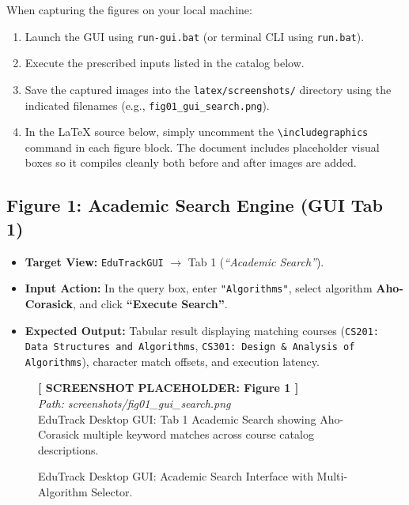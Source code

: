 \begin{tcolorbox}[colback=codebackground,colframe=primaryblue,title=\textbf{Instructions for Screenshot Inclusion}]
When capturing the figures on your local machine:
\begin{enumerate}
    \item Launch the GUI using \texttt{run-gui.bat} (or terminal CLI using \texttt{run.bat}).
    \item Execute the prescribed inputs listed in the catalog below.
    \item Save the captured images into the \texttt{latex/screenshots/} directory using the indicated filenames (e.g., \texttt{fig01\_gui\_search.png}).
    \item In the LaTeX source below, simply uncomment the \texttt{\textbackslash includegraphics} command in each figure block. The document includes placeholder visual boxes so it compiles cleanly both before and after images are added.
\end{enumerate}
\end{tcolorbox}

\subsection{Figure 1: Academic Search Engine (GUI Tab 1)}
\begin{itemize}
    \item \textbf{Target View:} \texttt{EduTrackGUI} $\to$ Tab 1 (\textit{``Academic Search''}).
    \item \textbf{Input Action:} In the query box, enter \texttt{"Algorithms"}, select algorithm \textbf{Aho-Corasick}, and click \textbf{``Execute Search''}.
    \item \textbf{Expected Output:} Tabular result displaying matching courses (\texttt{CS201: Data Structures and Algorithms}, \texttt{CS301: Design \& Analysis of Algorithms}), character match offsets, and execution latency.
\end{itemize}

\begin{figure}[H]
\centering
\begin{tcolorbox}[colback=white,colframe=codegray,width=0.92\textwidth,halign=center]
\vspace{0.8cm}
\textbf{[ SCREENSHOT PLACEHOLDER: Figure 1 ]}\\
\textit{Path: screenshots/fig01\_gui\_search.png}\\
\small EduTrack Desktop GUI: Tab 1 Academic Search showing Aho-Corasick multiple keyword matches across course catalog descriptions.
\vspace{0.8cm}
\end{tcolorbox}
\caption{EduTrack Desktop GUI: Academic Search Interface with Multi-Algorithm Selector.}
\label{fig:ss_search}
\end{figure}

